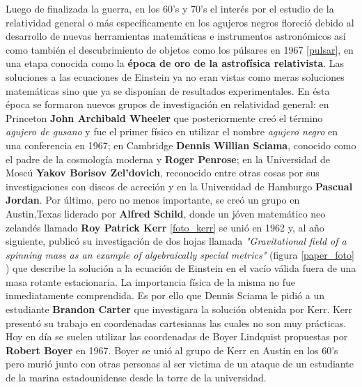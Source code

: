 \documentclass[12pt]{article}
\theoremstyle{plain}
\begin{document}
Luego de finalizada la guerra, en los 60's y 70's el interés por el estudio de la relatividad general o más específicamente en los agujeros negros floreció debido al desarrollo de nuevas herramientas matemáticas e instrumentos astronómicos así como también el descubrimiento de objetos como los púlsares en 1967 \ref{pulsar}, en una etapa conocida como la \textbf{época de oro de la astrofísica relativista}. Las soluciones a las ecuaciones de Einstein ya no eran vistas como meras soluciones matemáticas sino que ya se disponían de resultados experimentales. En ésta época se formaron nuevos grupos de investigación en relatividad general: en Princeton \textbf{John Archibald Wheeler} que posteriormente creó el término \textit{agujero de gusano} y fue el primer físico en utilizar el nombre \textit{agujero negro} en una conferencia en 1967; en Cambridge \textbf{Dennis Willian Sciama}, conocido como el padre de la cosmología moderna y \textbf{Roger Penrose}; en la Universidad de Moscú \textbf{Yakov Borisov Zel'dovich}, reconocido entre otras cosas por sus investigaciones con discos de acreción y en la Universidad de Hamburgo \textbf{Pascual Jordan}. Por último, pero no menos importante, se creó un grupo en Austin,Texas liderado por \textbf{Alfred Schild}, donde un jóven matemático neo zelandés llamado \textbf{Roy Patrick Kerr} \ref{foto_kerr} se unió en 1962 y, al año siguiente, publicó su investigación de dos hojas llamada \textit{"Gravitational field of a spinning mass as an example of algebraically special metrics"} \cite{kerr_paper}(figura \ref{paper_foto} ) que describe la solución a la ecuación de Einstein en el vacío válida fuera de una masa rotante estacionaria. La importancia física de la misma no fue inmediatamente comprendida. Es por ello que Dennis Sciama le pidió a un estudiante \textbf{Brandon Carter} que investigara la solución obtenida por Kerr. Kerr presentó su trabajo en coordenadas cartesianas las cuales no son muy prácticas. Hoy en día se suelen utilizar las coordenadas de Boyer Lindquist propuestas por \textbf{Robert Boyer} en 1967. Boyer se unió al grupo de Kerr en Austin en los 60's pero murió junto con otras personas al ser victima de un ataque de un estudiante de la marina estadounidense desde la torre de la universidad. 
\end{document}
